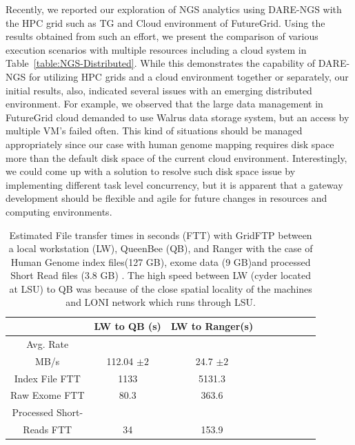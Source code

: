 \documentclass{sig-alternate}
\begin{document}
Recently, we reported our exploration of NGS analytics using DARE-NGS
with the HPC grid such as TG and Cloud environment of
FutureGrid\cite{ecmls11}.  Using the results obtained from such an
effort, we present the comparison of various execution scenarios with
multiple resources including a cloud system in
Table~\ref{table:NGS-Distributed}.  While this demonstrates the
capability of DARE-NGS for utilizing HPC grids and a cloud environment
together or separately, our initial results, also, indicated several
issues with an emerging distributed environment.  For example, we
observed that the large data management in FutureGrid cloud demanded
to use Walrus data storage system, but an access by multiple VM's
failed often.  This kind of situations should be managed appropriately
since our case with human genome mapping requires disk space more than
the default disk space of the current cloud
environment. Interestingly, we could come up with a solution to
resolve such disk space issue by implementing different task level
concurrency, but it is apparent that a gateway development should be
flexible and agile for future changes in resources and computing
environments.

 \begin{table}
 \small
 \begin{tabular}{|c|c|c|c|c|c|c|c|c|} 
 \hline  
 	          & LW to QB (s)  & LW to Ranger(s) \\
 \hline                       
Avg. Rate && \\
MB/s & 112.04 $\pm 2$ &	    24.7 $\pm 2$  \\
 \hline                       
Index File	FTT & 1133  &	    5131.3      \\        
 \hline                       
Raw 	 Exome FTT&80.3 & 363.6\\                  
 \hline                       
Processed Short-&    & \\
Reads FTT&34&153.9  \\
 \hline                       
                    
\end{tabular}


\caption{Estimated File transfer times in seconds (FTT) with GridFTP between a local workstation (LW), QueenBee (QB), and Ranger with the case of Human Genome index files(127 GB), exome data (9 GB)and processed Short Read files (3.8 GB) . The high speed between LW (cyder located at LSU) to QB was because of the close spatial locality of the machines and LONI network which runs through LSU.   }

 \label{table:NGS-Distributed-file} 
\end{table}
\end{document}
